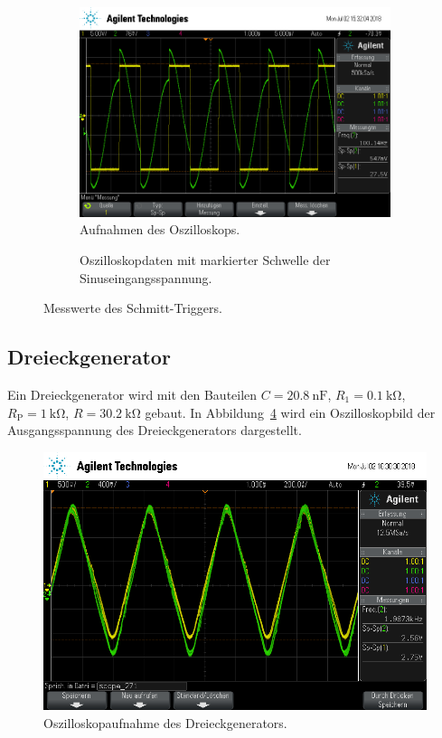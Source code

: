 \begin{figure}[ht]
  \centering
  \begin{subfigure}{\textwidth}
    \centering
    \includegraphics[height=0.3\textheight]{data/scope_268.png}
    \caption{Aufnahmen des Oszilloskops.}
    \label{fig:schmitt_osz}
  \end{subfigure}
  \begin{subfigure}{\textwidth}
    \centering
    
    \caption{Oszilloskopdaten mit markierter Schwelle der Sinuseingangsspannung.}
    \label{fig:schmitt_plot}
  \end{subfigure}
  \caption{Messwerte des Schmitt-Triggers.}
  \label{fig:schmitt}
\end{figure}

\subsection{Dreieckgenerator}
Ein Dreieckgenerator wird mit den Bauteilen
$C = \SI{20.8}{\nano\farad}$,
$R_1 = \SI{0.1}{\kilo\ohm}$,
$R_\text{P} = \SI{1}{\kilo\ohm}$,
$R = \SI{30.2}{\kilo\ohm}$
gebaut.
In Abbildung~\ref{fig:dreieck_generator} wird ein Oszilloskopbild
der Ausgangsspannung des Dreieckgenerators dargestellt.
\begin{figure}[ht]
  \centering
  \includegraphics[height=0.3\textheight]{data/scope_271.png}
  \caption{Oszilloskopaufnahme des Dreieckgenerators.}
  \label{fig:dreieck_generator}
\end{figure}

